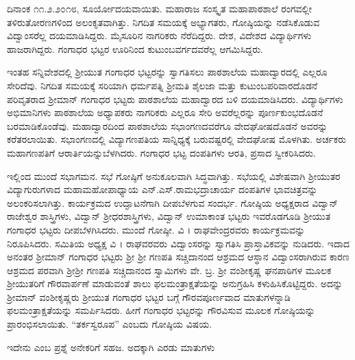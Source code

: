 {ದಿನಾಂಕ ೧೧.೨.೨೦೧೮, ಸೂರ್ಯೋದಯವಾಯಿತು. ಮಹಾರಾಜ ಸಂಸ್ಕೃತ ಮಹಾಪಾಠಶಾಲೆ ರಂಗವಲ್ಲೀ ತಳಿರುತೋರಣಗಳಿಂದ ಅಲಂಕೃತವಾಗಿತ್ತು. ನಿಗದಿತ ಸಮಯಕ್ಕೆ ಅಭ್ಯಾಗತರು, ಗೋಷ್ಠಿಯನ್ನು ನಡೆಸಿಕೊಡುವ ವಿದ್ವಾಂಸರೆಲ್ಲ ದಯಮಾಡಿಸಿದ್ದರು. ಮೈಸೂರಿನ ನಾಗರಿಕರು ನೆರೆದಿದ್ದರು. ದೇಶ, ವಿದೇಶದ ವಿದ್ಯಾರ್ಥಿಗಳು ಹಾಜರಾಗಿದ್ದರು. ಗಂಗಾಧರ ಭಟ್ಟರ ಊರಿನಿಂದ ಕುಟುಂಬವರ್ಗದವರೆಲ್ಲ ಆಗಮಿಸಿದ್ದರು. 

ಇಂತಹ ಸನ್ನಿವೇಶದಲ್ಲಿ ಶ್ರೀಯುತ ಗಂಗಾಧರ ಭಟ್ಟರನ್ನು ಸ್ವಾಗತಿಸಲು ಪಾಠ\-ಶಾಲೆಯ ಮಹಾದ್ವಾರದಲ್ಲಿ  ಎಲ್ಲರೂ ಸೇರಿದೆವು. ನಿಗದಿತ ಸಮಯಕ್ಕೆ ಸರಿಯಾಗಿ ಧರ್ಮಪತ್ನಿ ಶ್ರೀಮತಿ ಶೈಲಜಾ ಮತ್ತು ಕುಟುಂಬಪರಿವಾರದೊಡನೆ ಪರಿವೃತರಾದ ಶ್ರೀಮಾನ್ ಗಂಗಾಧರ ಭಟ್ಟರು ಪಾಠಶಾಲೆಯ ಮಹಾದ್ವಾರದ ಬಳಿ ದಯಮಾಡಿಸಿದರು. ವಿದ್ಯಾರ್ಥಿಗಳು ಅಭಿಮಾನಿಗಳು ಪಾಠಶಾಲೆಯ ಅಧ್ಯಾಪಕರು \hbox{ನಾಗರಿಕರು} ಎಲ್ಲರೂ ಸೇರಿ ಅವರೆಲ್ಲರನ್ನು ಪೂರ್ಣಕುಂಭದೊಡನೆ ಬರಮಾಡಿಕೊಂಡೆವು. ಮಹಾದ್ವಾರದಿಂದ ಪಾಠಶಾಲೆಯ ಸಭಾಂಗಣದವರೆಗೂ ವೇದಘೋಷದೊಡನೆ ಅವರನ್ನು ಕರೆತರಲಾಯಿತು. ಸಭಾಂಗಣದಲ್ಲಿ ವಿದ್ಯಾಗಣಪತಿಯ ಸಾನ್ನಿಧ್ಯಕ್ಕೆ ಬರುವಷ್ಟರಲ್ಲಿ ವೇದಘೋಷ ಮೊಳಗಿತು. ಅರ್ಚಕರು  ಮಹಾಗಣಪತಿಗೆ ಆರಾರ್ತಿಯನ್ನು\break ಬೆಳಗಿದರು. ಗಂಗಾಧರ ಭಟ್ಟ ದಂಪತಿಗಳು ಆರತಿ, ಪ್ರಸಾದ ಸ್ವೀಕರಿಸಿದರು.

ಇಲ್ಲಿಂದ ಮುಂದೆ ಸಭಾಗಮನ. ಸಭೆ ಗೋಷ್ಠಿಗೆ ಅನುಕೂಲವಾಗಿ ಸಿದ್ಧವಾಗಿತ್ತು. ಸಭೆಯಲ್ಲಿ ವಿಶೇಷವಾಗಿ ಶ್ರೀಯುತರ ವಿದ್ಯಾಗುರುಗಳಾದ ಮಹಾಮಹೋಪಾಧ್ಯಾಯ ಎನ್.ಎಸ್.ರಾಮಭದ್ರಾಚಾರ್ಯ ದಂಪತಿಗಳ ಭಾವಚಿತ್ರವನ್ನು ಅಲಂಕರಿಸಲಾಗಿತ್ತು.  ಕಾರ್ಯಕ್ರಮದ ಉದ್ಘಾಟನೆಗಾಗಿ ದೀಪಬೆಳಗುವ ಸಂದರ್ಭ. ಗೋಷ್ಠಿಯ \hbox{ಅಧ್ಯಕ್ಷ}ರಾದ ವಿದ್ವಾನ್ ರಾಜೇಶ್ವರ ಶಾಸ್ತ್ರಿಗಳು, ವಿದ್ವಾನ್ ಶ್ರೀಧರಶಾಸ್ತ್ರಿಗಳು, ವಿದ್ವಾನ್ ಉಮಾಕಾಂತ ಭಟ್ಟರು ಇವರೊಡಗೂಡಿ ಶ್ರೀಯುತ ಗಂಗಾಧರ ಭಟ್ಟರು ದೀಪಬೆಳಗಿ\-ಸಿದರು. ಮುಂದೆ ಗೋಷ್ಠೀ. ವಿ  । ರಾಘವೇಂದ್ರರವರು ಕಾರ್ಯಕ್ರಮವನ್ನು ನಿರೂಪಿಸಿದರು. ಸಮಿತಿಯ ಅಧ್ಯಕ್ಷ ವಿ । ರಾಘವರವರು ವಿದ್ವಾಂಸರನ್ನು ಸ್ವಾಗತಿಸಿ ಪ್ರಾಸ್ತಾವಿಕವನ್ನು ನುಡಿದರು. ಇದಾದ ಅನಂತರ  ಶ್ರೀಮಾನ್ ಗಂಗಾಧರ ಭಟ್ಟರು ಶ್ರೀ ಶ್ರೀ ಗಣಪತಿ ಸಚ್ಚಿದಾನಂದ ಆಶ್ರಮದ ಆಸ್ಥಾನ ವಿದ್ವಾಂಸರಾಗಿರುವ  ಕಾರಣ ಆಶ್ರಮದ ಪರವಾಗಿ ಶ್ರೀಶ್ರೀ ಗಣಪತಿ ಸಚ್ಚಿದಾನಂದ ಸ್ವಾಮಿಗಳು ವೇ. ಬ್ರ. ಶ್ರೀ ವಂಶೀಕೃಷ್ಣ ಘನಪಾಠಿಗಳ ಮೂಲಕ  ಶ್ರೀಯುತರಿಗೆ ಗೌರವಾರ್ಪಣೆ ಮಾಡುವಂತೆ ಶಾಲು ಫಲಮಂತ್ರಾಕ್ಷತೆಯನ್ನು ಅನುಗ್ರಹಿಸಿ ಕಳುಹಿಸಿಕೊಟ್ಟಿದ್ದರು. ಅದನ್ನು ಶ್ರೀಮಾನ್ ವಂಶೀಕೃಷ್ಣರು ಶ್ರೀಯುತ ಗಂಗಾಧರ ಭಟ್ಟರ ಬಗ್ಗೆ ಗೌರವಪೂರ್ಣವಾದ ಮಾತುಗಳನ್ನಾಡಿ ಫಲಮಂತ್ರಾಕ್ಷತೆಯನ್ನು \hbox{ಸಮರ್ಪಿಸಿದರು.} ಹೀಗೆ ಗಂಗಾಧರ ಭಟ್ಟರನ್ನು ಗೌರವಿಸುವ ಮೂಲಕ  ಗೋಷ್ಠಿಯನ್ನು ಪ್ರಾರಂಭಿಸ\-ಲಾಯಿತು. 
 “ತರ್ಕಸ್ವರೂಪ” ಎಂಬದು ಗೋಷ್ಠಿಯ ವಿಷಯ. 

ಇದೇನು ಎಂಬ ಪ್ರಶ್ನೆ ಅನೇಕರಿಗೆ ಸಹಜ. ಅದಕ್ಕಾಗಿ  ಎರಡು ಮಾತುಗಳು \enginline{-}

}
